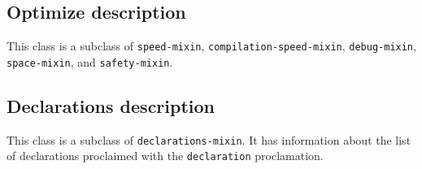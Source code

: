 \subsection{Optimize description}
\label{sec-instantiable-classes-optimize-desciption}

{\footnotesize
{}
}

This class is a subclass of \texttt{speed-mixin},
\texttt{compilation-speed-mixin}, \texttt{debug-mixin},
\texttt{space-mixin}, and \texttt{safety-mixin}.

\subsection{Declarations description}
\label{sec-instantiable-classes-declarations-description}

{\footnotesize
{}
}

This class is a subclass of \texttt{declarations-mixin}.
It has information about the list of declarations proclaimed
with the \texttt{declaration} proclamation.
